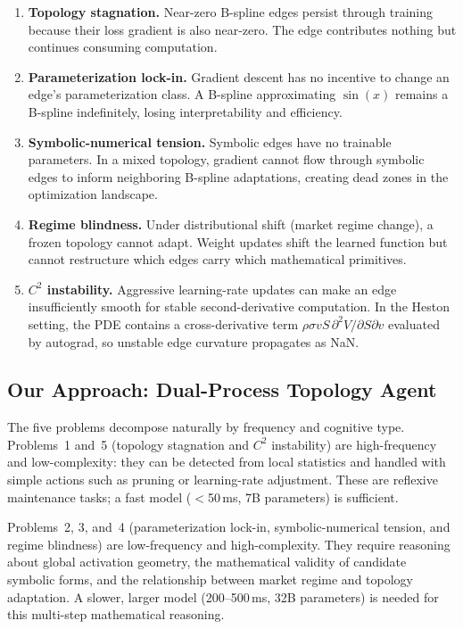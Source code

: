 \documentclass[11pt,a4paper]{article}
\begin{document}
\begin{enumerate}[nosep]
  \item \textbf{Topology stagnation.} Near-zero B-spline edges persist through training
  because their loss gradient is also near-zero. The edge contributes nothing but
  continues consuming computation.

  \item \textbf{Parameterization lock-in.} Gradient descent has no incentive to change
  an edge's parameterization class. A B-spline approximating $\sin(x)$ remains a
  B-spline indefinitely, losing interpretability and efficiency.

  \item \textbf{Symbolic-numerical tension.} Symbolic edges have no trainable parameters.
  In a mixed topology, gradient cannot flow through symbolic edges to inform neighboring
  B-spline adaptations, creating dead zones in the optimization landscape.

  \item \textbf{Regime blindness.} Under distributional shift (market regime change), a
  frozen topology cannot adapt. Weight updates shift the learned function but cannot
  restructure which edges carry which mathematical primitives.

  \item \textbf{$C^2$ instability.} Aggressive learning-rate updates can make an edge
  insufficiently smooth for stable second-derivative computation. In the Heston setting,
  the PDE contains a cross-derivative term $\rho\sigma vS\,\partial^2 V/\partial S\partial v$
  evaluated by autograd, so unstable edge curvature propagates as NaN.
\end{enumerate}

\subsection{Our Approach: Dual-Process Topology Agent}

The five problems decompose naturally by frequency and cognitive type. Problems~1 and~5
(topology stagnation and $C^2$ instability) are high-frequency and low-complexity: they
can be detected from local statistics and handled with simple actions such as pruning or
learning-rate adjustment. These are reflexive maintenance tasks; a fast model ($<$50\,ms,
7B parameters) is sufficient.

Problems~2, 3, and~4 (parameterization lock-in, symbolic-numerical tension, and regime
blindness) are low-frequency and high-complexity. They require reasoning about global
activation geometry, the mathematical validity of candidate symbolic forms, and the
relationship between market regime and topology adaptation. A slower, larger model
(200--500\,ms, 32B parameters) is needed for this multi-step mathematical reasoning.
\end{document}
